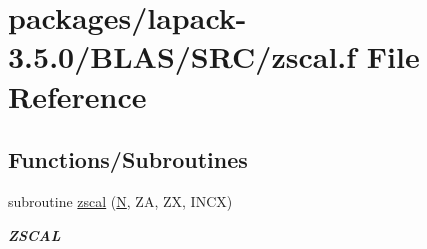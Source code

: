 \hypertarget{lapack-3_85_80_2BLAS_2SRC_2zscal_8f}{}\section{packages/lapack-\/3.5.0/\+B\+L\+A\+S/\+S\+R\+C/zscal.f File Reference}
\label{lapack-3_85_80_2BLAS_2SRC_2zscal_8f}
\subsection*{Functions/\+Subroutines}
\begin{DoxyCompactItemize}
\item 
subroutine \hyperlink{group__complex16__blas__level1_gaceea1208dcd46b6e5468fbfb53b9281b}{zscal} (\hyperlink{polmisc_8c_a0240ac851181b84ac374872dc5434ee4}{N}, Z\+A, Z\+X, I\+N\+C\+X)
\begin{DoxyCompactList}\small\item\em {\bfseries Z\+S\+C\+A\+L} \end{DoxyCompactList}\end{DoxyCompactItemize}

